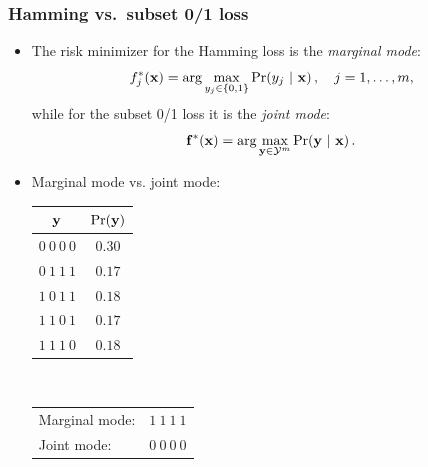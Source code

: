 \documentclass[11pt,compress,t,notes=noshow, xcolor=table]{beamer}
\begin{document}
\begin{frame}
	\frametitle{Hamming vs.\ subset 0/1 loss}
	\begin{itemize}
		\item The risk minimizer for the Hamming loss is the  \emph{marginal mode}:
		$$
		f_j^*(\mathbf{x}) = \arg \max_{y_j \in \{0,1\}} \Pr( y_j  ~|~ \mathbf{x} )\,, \quad j = 1,\ldots,m ,
		$$
		while for the subset 0/1 loss it is the \emph{joint mode}:
		$$
		\mathbf{f}^*(\mathbf{x}) = \arg \max_{\mathbf{y} \in \mathcal{Y}^m} \Pr(\mathbf{y} ~|~ \mathbf{x}) \,.
		$$
		\item Marginal mode vs. joint mode:\\[6pt]
		\begin{center}
			\begin{tabular}{@{}cc@{}}
				\toprule
				$\mathbf{y}$ & $\Pr(\mathbf{y})$ \\
				\hline
				$0~0~0~0$ & $0.30$ \\
				$0~1~1~1$ & $0.17$ \\
				$1~0~1~1$ & $0.18$ \\
				$1~1~0~1$ & $0.17$ \\
				$1~1~1~0$ & $0.18$ \\
				\toprule
			\end{tabular}
			$\qquad$
			\footnotesize{
				\begin{tabular}{lr}
					Marginal mode: & $1~1~1~1$ \\
					Joint mode: & $0~0~0~0$ \\
				\end{tabular}
			}
		\end{center}
	\end{itemize}
\end{frame}
\end{document}
